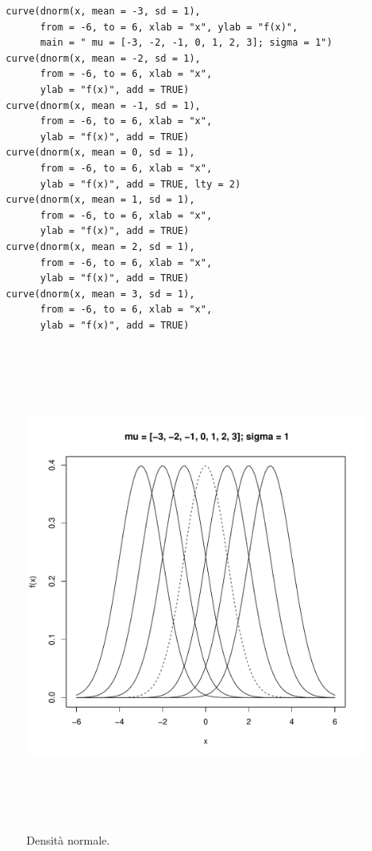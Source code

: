 \vspace{5mm}
\begin{lstlisting}
  curve(dnorm(x, mean = -3, sd = 1),
        from = -6, to = 6, xlab = "x", ylab = "f(x)",
        main = " mu = [-3, -2, -1, 0, 1, 2, 3]; sigma = 1")
  curve(dnorm(x, mean = -2, sd = 1),
        from = -6, to = 6, xlab = "x",
        ylab = "f(x)", add = TRUE)
  curve(dnorm(x, mean = -1, sd = 1),
        from = -6, to = 6, xlab = "x",
        ylab = "f(x)", add = TRUE)
  curve(dnorm(x, mean = 0, sd = 1),
        from = -6, to = 6, xlab = "x",
        ylab = "f(x)", add = TRUE, lty = 2)
  curve(dnorm(x, mean = 1, sd = 1),
        from = -6, to = 6, xlab = "x",
        ylab = "f(x)", add = TRUE)
  curve(dnorm(x, mean = 2, sd = 1),
        from = -6, to = 6, xlab = "x",
        ylab = "f(x)", add = TRUE)
  curve(dnorm(x, mean = 3, sd = 1),
        from = -6, to = 6, xlab = "x",
        ylab = "f(x)", add = TRUE)
\end{lstlisting}
\vspace{5mm}

\begin{figure}[!htb]
    \centering
    \includegraphics[height=16cm]{capitoli/images/1_introduzione/dens_prob_val.pdf}
    \caption{Densità normale.}
\end{figure}

